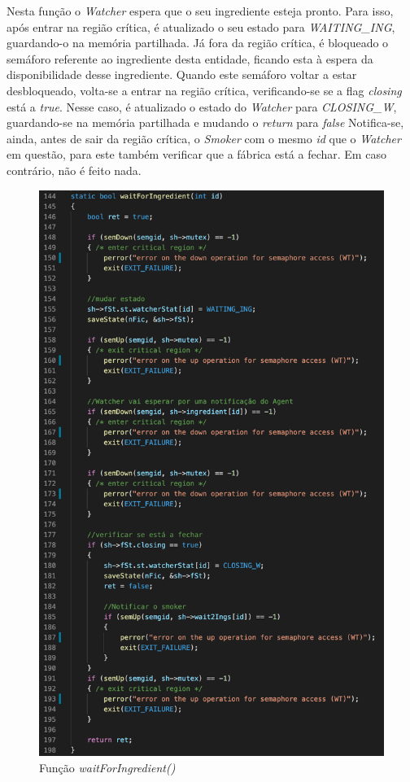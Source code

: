 \documentclass[10pt,portuguese]{article}
\begin{document}
\par Nesta função o \textit{Watcher} espera que o seu ingrediente esteja pronto. Para isso, após entrar na região crítica, é atualizado o seu estado para \textit{WAITING\_ING}, guardando-o na memória partilhada. Já fora da região crítica, é bloqueado o semáforo referente ao ingrediente desta entidade, ficando esta à espera da disponibilidade desse ingrediente. Quando este semáforo voltar a estar desbloqueado, volta-se a entrar na região crítica, verificando-se se a flag \textit{closing} está a \textit{true}. Nesse caso, é atualizado o estado do \textit{Watcher} para \textit{CLOSING\_W}, guardando-se na memória partilhada e mudando o \textit{return} para \textit{false} Notifica-se, ainda, antes de sair da região crítica, o \textit{Smoker} com o mesmo \textit{id} que o \textit{Watcher} em questão, para este também verificar que a fábrica está a fechar. Em caso contrário, não é feito nada.

\begin{figure}[!h]
    \centering
    \includegraphics[scale=0.7]{images/implementation/waitforing.png}
    \caption{Função \textit{waitForIngredient()}}
\end{figure}
\end{document}
